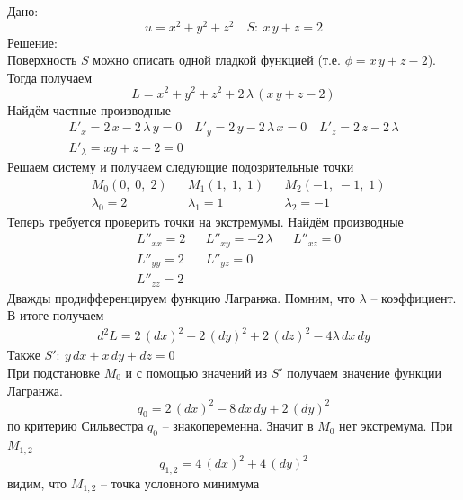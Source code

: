\begin{Example}
    Дано:
    \[
        u = x^2 + y^2 + z^2 \quad S:\: x\,y + z = 2
    \]
    Решение:\\
    Поверхность $S$ можно описать одной гладкой функцией (т.е. $\phi = x\,y + z - 2$). Тогда получаем
    \begin{equation*}
        L = x^2 + y^2 + z^2 + 2\,\lambda\,(x\,y + z - 2)
    \end{equation*}
    Найдём частные производные
    \begin{gather*}
        L'_x = 2\,x - 2\,\lambda\,y = 0 \quad L'_y = 2\,y - 2\,\lambda\,x = 0 \quad L'_z = 2\,z - 2\,\lambda \\ L'_{\lambda} = xy + z - 2 = 0
    \end{gather*}
    Решаем систему и получаем следующие подозрительные точки
    \begin{align*}
        &M_0(0,\; 0,\; 2) && M_1(1,\; 1,\; 1) && M_2(-1,\; -1,\; 1)\\
        & \lambda_0 = 2 && \lambda_1 = 1 && \lambda_2 = -1
    \end{align*}
    Теперь требуется проверить точки на экстремумы. Найдём производные
    \begin{align*}
        &L''_{xx} = 2 && L''_{xy} = -2\,\lambda && L''_{xz} = 0 \\
        &L''_{yy} = 2 && L''_{yz} = 0\\
        &L''_{zz} = 2
    \end{align*}
    Дважды продифференцируем функцию Лагранжа. Помним, что $\lambda$ -- коэффициент. В итоге получаем
    \begin{gather*}
        d^2L = 2\,(dx)^2 + 2\,(dy)^2 + 2\,(dz)^2 - 4\lambda\,dx\,dy
    \end{gather*}
    Также $S':\: y\,dx + x\,dy + dz = 0$\\
    При подстановке $M_0$ и с помощью значений из $S'$ получаем значение функции Лагранжа.
    \[
        q_0 = 2\,(dx)^2 - 8\,dx\,dy + 2\,(dy)^2
    \]
    по критерию Сильвестра $q_0$ -- знакопеременна. Значит в $M_0$ нет экстремума.
    При $M_{1,2}$
    \[
        q_{1,2} = 4\,(dx)^2 + 4\,(dy)^2
    \]
    видим, что $M_{1,2}$ -- точка условного минимума
\end{Example}